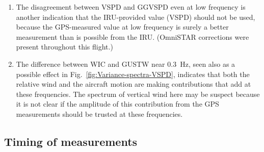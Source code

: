 \documentclass[12pt,twoside,english]{article}\usepackage[]{graphicx}\usepackage[]{color}
\newenvironment{knitrout}{}{} %
\let\OrgIndex\index
\renewcommand*{\index}[1]{\OrgIndex{#1}}
\begin{document}
{{\begin{enumerate}
\begin{knitrout}
\begin{figure}
{\centering \texttt{[image: figure/WU-phugoid-plot-1]} 

}

\caption[Coupled variations in pitch, altitude, and airspeed for a segment of flight in smooth air, illustrating normal variations in flight conditions.]{Coupled variations in pitch, altitude, and airspeed for a segment of flight in smooth air from DEEPWAVE flight 15, 3:40:00--3:45:00~UTC, an illustration of normal variations in flight conditions. GGALT = aircraft altitude; PITCH = pitch angle; AKRD = angle of attack; TAS = airspeed.}\label{fig:phugoid-plot}
\end{figure}


\end{knitrout}

%

\item The disagreement between VSPD and GGVSPD even at low frequency is another indication that the IRU-provided value (VSPD) should not be used, because the GPS-measured value at low frequency is surely a better measurement than is possible from the IRU. (OmniSTAR corrections were present throughout this flight.)  
\item The difference between WIC and GUSTW near 0.3~Hz, seen also as a possible effect in Fig.~\ref{fig:Variance-spectra-VSPD}, indicates that both the relative wind and the aircraft motion are making contributions that add at these frequencies. The spectrum of vertical wind here may be suspect because it is not clear if the amplitude of this contribution from the GPS measurements should be trusted at these frequencies. 
\end{enumerate}

\subsection{Timing of measurements\label{sub:Timing}}

}}
\end{document}
